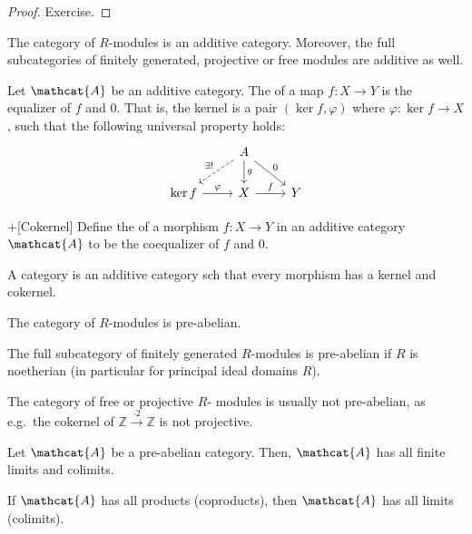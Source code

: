 \begin{proof}
  Exercise.
\end{proof}

\begin{example}
  The category of $R$-modules is an additive category.
  Moreover, the full subcategories of finitely generated,
  projective or free modules are additive as well.
\end{example}

\begin{definition}[Kernel]
  \label{def:kernel}
  Let $\mathcat{A}$ be an additive category.
  The  of a map $f\colon X\to Y$
  is the equalizer of $f$ and  $0$.
  That is, the kernel is a pair  $(\ker f, \varphi)$
  where $\varphi \colon \ker f \to X$, such that the following
  universal property holds:
  \[
    \begin{tikzcd}
      &
      A
      \ar[dashed, swap]{dl}{\exists !}
      \ar{d}{g}
      \ar{dr}{0}
      \\
      \ker f
      \ar{r}{\varphi}
      &
      X
      \ar{r}{f}
      &
      Y
    \end{tikzcd}
  \]
\end{definition}

\begin{definition}+[Cokernel]
  \label{def:cokernel}
  Define the  of a morphism $f\colon X\to Y$
  in an additive category $\mathcat{A}$ to be the coequalizer
  of $f$ and  $0$.
\end{definition}

\begin{definition}
  A  category is an additive category
  sch that every morphism has a kernel and cokernel.
\end{definition}

\begin{example}
  The category of $R$-modules is pre-abelian.

  The full subcategory of finitely generated $R$-modules
  is pre-abelian if  $R$ is noetherian
  (in particular for  principal ideal domains $R$).

  The category of free or projective $R$- modules is usually
  not pre-abelian,
  as e.g.~the cokernel of $\mathbb{Z} \xrightarrow{\cdot 2} \mathbb{Z}$
  is not projective.
\end{example}

\begin{proposition}
  \label{prop:limits-in-pre-abelian-category}
  Let $\mathcat{A}$ be a pre-abelian category.
  Then, $\mathcat{A}$ has all finite limits and colimits.

  If $\mathcat{A}$ has all products (coproducts),
  then $\mathcat{A}$ has all limits (colimits).
\end{proposition}

